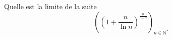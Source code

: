  Quelle est la limite de la suite
$$((1+\frac{n}{\ln n})^{\frac{n}{\ln n}})_{n\in
\mathbb{N}^{*}}$$ \bigskip 
